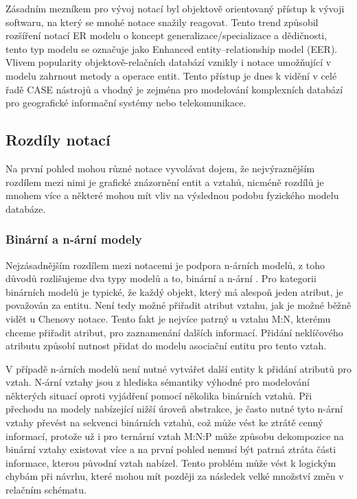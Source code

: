 \documentclass[czech,bachelor,public,dept460,male,oneside]{diploma}
\begin{document}
	Zásadním mezníkem pro vývoj notací byl objektově orientovaný přístup k vývoji softwaru, na který se mnohé notace snažily reagovat. Tento trend způsobil rozšíření notací ER modelu o koncept generalizace/specializace a dědičnosti, tento typ modelu se označuje jako  Enhanced entity–relationship model (EER). Vlivem popularity objektově-relačních databází vznikly i notace umožňující v modelu zahrnout metody a operace entit. Tento přístup je dnes k vidění v celé řadě CASE nástrojů a  vhodný je zejména pro modelování komplexních databází pro geografické informační systémy nebo telekomunikace.
	
	\subsection{Rozdíly notací}
	Na první pohled mohou různé notace vyvolávat dojem, že nejvýraznějším rozdílem mezi nimi je grafické znázornění entit a vztahů, nicméně rozdílů je mnohem více a některé mohou mít vliv na výslednou podobu fyzického modelu databáze.
	
	\subsubsection{Binární a n-ární modely}
	Nejzásadnějším rozdílem mezi notacemi je podpora n-árních modelů, z toho důvodů rozlišujeme dva typy modelů a to, binární a n-ární \cite{compErNotations}. Pro kategorii binárních modelů je typické, že každý objekt, který má alespoň jeden atribut, je považován za entitu. Není tedy možné přiřadit atribut vztahu, jak je možné běžně vidět u Chenovy notace. Tento fakt je nejvíce patrný u vztahu M:N, kterému chceme přiřadit atribut, pro zaznamenání dalších informací. Přidání neklíčového atributu způsobí nutnost přidat do modelu asociační entitu pro tento vztah. 
	
	V případě n-árních modelů není nutné vytvářet další entity k přidání atributů pro vztah. N-ární vztahy jsou z hlediska sémantiky výhodné pro modelování některých situací oproti vyjádření pomocí několika binárních vztahů. Při přechodu na modely nabízející nižší úroveň abstrakce, je často nutné tyto n-ární vztahy převést na sekvenci binárních vztahů, což může vést ke ztrátě cenný informací, protože už i pro ternární vztah M:N:P může způsobu dekompozice na binární vztahy existovat více a na první pohled nemusí být patrná ztráta části informace, kterou původní vztah nabízel. Tento problém může vést k logickým chybám při návrhu, které mohou mít později za následek velké množství změn v relačním schématu.
	
\end{document}
